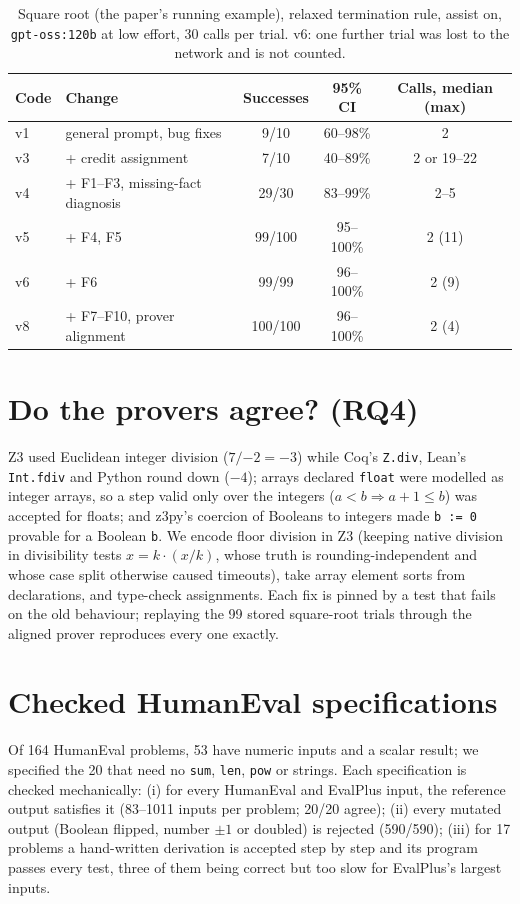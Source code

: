 \documentclass[10pt]{article}
\newcommand{\code}[1]{\texttt{#1}}
\begin{document}
\begin{table}[t]
\centering\small
\begin{tabular}{@{}llccc@{}}
\toprule
Code & Change & Successes & 95\% CI & Calls, median (max)\\
\midrule
v1 & general prompt, bug fixes & 9/10 & 60--98\% & 2\\
v3 & + credit assignment & 7/10 & 40--89\% & 2 or 19--22\\
v4 & + F1--F3, missing-fact diagnosis & 29/30 & 83--99\% & 2--5\\
v5 & + F4, F5 & 99/100 & 95--100\% & 2 (11)\\
v6 & + F6 & 99/99 & 96--100\% & 2 (9)\\
v8 & + F7--F10, prover alignment & 100/100 & 96--100\% & 2 (4)\\
\bottomrule
\end{tabular}
\caption{Square root (the paper's running example), relaxed termination rule, assist on, \code{gpt-oss:120b} at low effort, 30 calls per trial. v6: one further trial was lost to the network and is not counted.}
\label{tab:sqrt}
\end{table}

\section{Do the provers agree? (RQ4)}
Z3 used Euclidean integer division ($7/{-2}=-3$) while Coq's \code{Z.div}, Lean's \code{Int.fdiv} and Python round down ($-4$); arrays declared \code{float} were modelled as integer arrays, so a step valid only over the integers ($a<b\Rightarrow a+1\le b$) was accepted for floats; and z3py's coercion of Booleans to integers made \code{b := 0} provable for a Boolean \code{b}. We encode floor division in Z3 (keeping native division in divisibility tests $x=k\cdot(x/k)$, whose truth is rounding-independent and whose case split otherwise caused timeouts), take array element sorts from declarations, and type-check assignments. Each fix is pinned by a test that fails on the old behaviour; replaying the 99 stored square-root trials through the aligned prover reproduces every one exactly.

\section{Checked HumanEval specifications}
Of 164 HumanEval problems, 53 have numeric inputs and a scalar result; we specified the 20 that need no \code{sum}, \code{len}, \code{pow} or strings. Each specification is checked mechanically: (i) for every HumanEval and EvalPlus input, the reference output satisfies it (83--1011 inputs per problem; 20/20 agree); (ii) every mutated output (Boolean flipped, number $\pm1$ or doubled) is rejected (590/590); (iii) for 17 problems a hand-written derivation is accepted step by step and its program passes every test, three of them being correct but too slow for EvalPlus's largest inputs.
\end{document}
